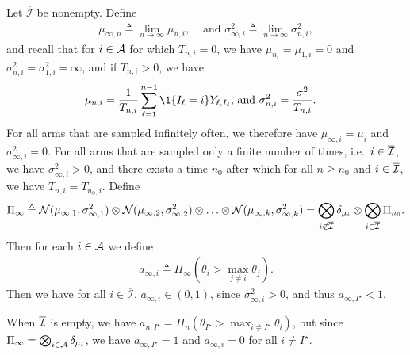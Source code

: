 Let  $\overline{\mathcal{I}}$ be nonempty. Define
	\begin{align*}
	\mu_{\infty, n} \triangleq \lim_{n \rightarrow \infty} \mu_{n, i}, &\text{     and    } \sigma_{\infty, i}^2  \triangleq \lim_{n \rightarrow \infty} \sigma^2_{n,i},
	\end{align*}
and recall that for $i \in \mathcal{A}$ for which $T_{n,i} = 0$, we have $\mu_{n_i} = \mu_{1,i} = 0$ and $\sigma^2_{n,i} = \sigma^2_{1, i} = \infty$, and if $T_{n,i} > 0$, we have
	\begin{align*}
	\mu_{n,i} = \frac{1}{T_{n,i}} \sum_{\ell = 1}^{n-1} \1{\{ I_\ell = i \}} Y_{\ell, I_\ell}, &\text{     and    } \sigma^2_{n,i} = \frac{\sigma^2}{T_{n,i}}.
	\end{align*}
For all arms that are sampled infinitely often, we therefore have $\mu_{\infty, i} = \mu_i$ and $\sigma_{\infty, i}^2 = 0$. For all arms that are sampled only a finite number of times, i.e.\ $i \in \overline{\mathcal{I}}$, we have $\sigma_{\infty, i}^2 > 0$, and there exists a time $n_0$ after which for all $n \geq n_0$ and $i \in \overline{\mathcal{I}}$, we have $T_{n,i} = T_{n_0,i}$. Define
	\begin{align*}
	\Pi_\infty \triangleq \mathcal{N}(\mu_{\infty, 1}, \sigma_{\infty, 1}^2) \otimes \mathcal{N}(\mu_{\infty, 2}, \sigma_{\infty, 2}^2) \otimes \ldots \otimes \mathcal{N}(\mu_{\infty, k}, \sigma_{\infty, k}^2)
	= \bigotimes_{i \not\in \overline{\mathcal{I}}} \delta_{\mu_i} \otimes \bigotimes_{i \in \overline{\mathcal{I}}} \Pi_{n_0}.
	\end{align*}
Then for each $i \in \mathcal{A}$ we define
	\begin{align*}
	a_{\infty, i} \triangleq \Pi_\infty \left( \theta_i > \max_{j \neq i} \theta_j \right). 
	\end{align*}
Then we have for all $i \in \overline{\mathcal{I}}$, $a_{\infty, i} \in (0,1)$, since $\sigma_{\infty, i}^2 > 0$, and thus $a_{\infty, I^\star} < 1$. 

When $\overline{\mathcal{I}}$ is empty, we have $ a_{n,I^\star} = \Pi_{n} (\theta_{I^\star} > \max_{i \neq I^\star} \theta_i) $, but since $\Pi_\infty = \bigotimes_{i \in \mathcal{A}} \delta_{\mu_i}$, we have $a_{\infty, I^\star} = 1$ and $a_{\infty, i} = 0$ for all $i \neq I^\star$.
 	
\hfill\BlackBox\\[2mm]
